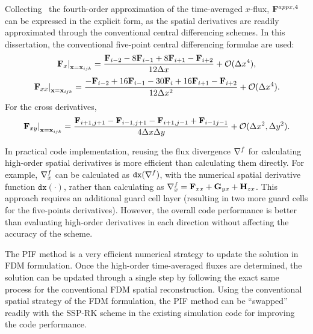 Collecting~ the fourth-order approximation of the time-averaged \( x \)-flux,
\( \mathbf{F}^{appx, 4} \) can be expressed in the explicit form, as the spatial derivatives
are readily approximated through the conventional central differencing schemes.
In this dissertation, the conventional five-point central differencing formulae are used:
\begin{equation}\label{eq:pif_central_dfdx}
    \left. \mathbf{F}_{x} \right|_{\mathbf{x} = \mathbf{x}_{ijk}} = \frac{\mathbf{F}_{i-2} - 8 \mathbf{F}_{i-1} + 8 \mathbf{F}_{i+1} - \mathbf{F}_{i+2} }{12\Delta x} + \mathcal{O}(\Delta x^{4}),
\end{equation}
\begin{equation}\label{eq:pif_central_dfdxx}
    \left. \mathbf{F}_{xx} \right|_{\mathbf{x} = \mathbf{x}_{ijk}} = \frac{-\mathbf{F}_{i-2} + 16 \mathbf{F}_{i-1} - 30 \mathbf{F}_{i} + 16 \mathbf{F}_{i+1} - \mathbf{F}_{i+2} }{12\Delta x^{2}} + \mathcal{O}(\Delta x^{4}).
\end{equation}
For the cross derivatives,
\begin{equation}\label{eq:pif_central_dfdxy}
    \left. \mathbf{F}_{xy} \right |_{\mathbf{x} = \mathbf{x}_{ijk}} =
    \frac{\mathbf{F}_{i+1, j+1} - \mathbf{F}_{i-1, j+1} - \mathbf{F}_{i+1, j-1} + \mathbf{F}_{i-1 j-1}}{4\Delta x\Delta y} + \mathcal{O}(\Delta x^{2}, \Delta y^{2}).
\end{equation}


In practical code implementation, reusing the flux divergence \( \nabla^{f} \)
for calculating high-order spatial derivatives is more efficient than calculating them directly.
For example, \( \nabla^{f}_{x} \) can be calculated as \( \texttt{dx}(\nabla^{f}) \),
with the numerical spatial derivative function \( \texttt{dx}(\cdot) \),
rather than calculating as \( \nabla^{f}_{x} = \mathbf{F}_{xx} + \mathbf{G}_{yx}+ \mathbf{H}_{zx} \).
This approach requires an additional guard cell layer
(resulting in two more guard cells for the five-points derivatives).
However, the overall code performance is better than
evaluating high-order derivatives in each direction without affecting the accuracy of the scheme.

The PIF method is a very efficient numerical strategy to update the solution in FDM formulation.
Once the high-order time-averaged fluxes are determined, the solution can be updated
through a single step by following the exact same process for the conventional FDM spatial reconstruction.
Using the conventional spatial strategy of the FDM formulation,
the PIF method can be ``swapped'' readily with the SSP-RK scheme
in the existing simulation code for improving the code performance.

